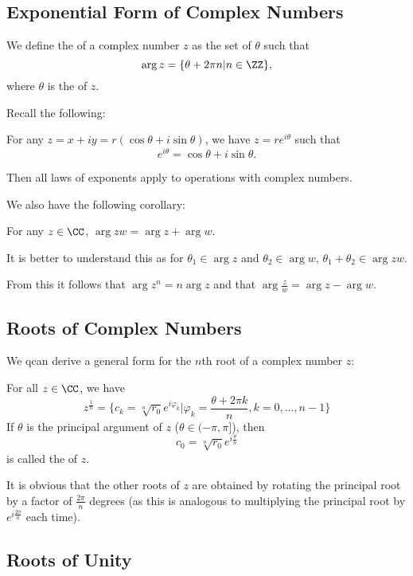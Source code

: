 \subsection{Exponential Form of Complex Numbers}

We define the  of a complex number $z$ as the set of $\theta$ such that 
\[ \arg{z} = \{ \theta + 2\pi n | n \in \ZZ \}, \] where $\theta$ is the  of $z$. 

Recall the following: 
\begin{theorem}
For any $z = x + iy = r(\cos{\theta} + i\sin{\theta})$, we have $z = re^{i\theta}$ such that 
\[ e^{i\theta} = \cos{\theta} + i\sin{\theta}. \] 

Then all laws of exponents apply to operations with complex numbers. 
\end{theorem}

We also have the following corollary: 
\begin{corollary*}
For any $z \in \CC$, $\arg{zw} = \arg{z} + \arg{w}$. 
\end{corollary*}
It is better to understand this as for $\theta_1 \in \arg{z}$ and $\theta_2 \in \arg{w}$, $\theta_1 + \theta_2 \in \arg{zw}$. 

From this it follows that $\arg{z^n} = n\arg{z}$ and that $\arg{\frac{z}{w}} = \arg{z} - \arg{w}$. 


\subsection{Roots of Complex Numbers}

We qcan derive a general form for the $n$th root of a complex number $z$: 
\begin{proposition}
For all $z \in \CC$, we have 
\[ z^{\frac{1}{n}} = \{ c_k = \sqrt[n]{r_0}e^{i\varphi_k} | \varphi_k = \frac{\theta + 2\pi k}{n}, k = 0,\ldots,n-1 \} \] 
If $\theta$ is the principal argument of $z$ ($\theta \in (-\pi, \pi]$), then 
\[ c_0 = \sqrt[n]{r_0}e^{i\frac{\theta}{n}} \] is called the  of $z$. 
\end{proposition}
It is obvious that the other roots of $z$ are obtained by rotating the principal root by a factor of $\frac{2\pi}{n}$ degrees (as this is analogous to multiplying the principal root by $e^{i \frac{2\pi}{n}}$ each time). 

\subsection{Roots of Unity}

